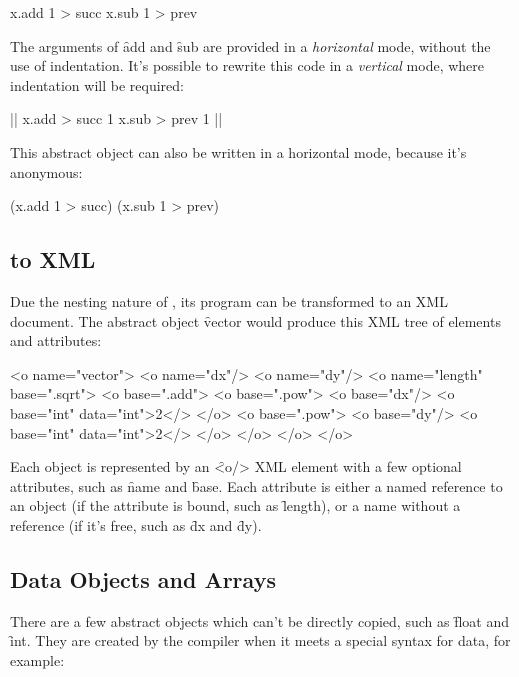 \begin{eocode}
[x]
  x.add 1 > succ
  x.sub 1 > prev
\end{eocode}

The arguments of \f{add} and \f{sub} are provided in a \emph{horizontal}
mode, without the use of indentation. It's possible to rewrite this code
in a \emph{vertical} mode, where indentation will be required:

\begin{eocode}
[x] |$\label{ln:succ}$|
  x.add > succ
    1
  x.sub > prev
    1 |$\label{ln:succ-end}$|
\end{eocode}

This abstract object can also be written in a horizontal mode,
because it's anonymous:

\begin{eocode}
[x] (x.add 1 > succ) (x.sub 1 > prev)
\end{eocode}

\subsection{\eo{} to XML}\label{sec:xml}

Due the nesting nature of \eo{}, its program can be transformed
to an XML document. The abstract object \f{vector} would produce
this XML tree of elements and attributes:

\begin{eocode}
<o name="vector">
  <o name="dx"/>
  <o name="dy"/>
  <o name="length" base=".sqrt">
    <o base=".add">
      <o base=".pow">
        <o base="dx"/>
        <o base="int" data="int">2</>
      </o>
      <o base=".pow">
        <o base="dy"/>
        <o base="int" data="int">2</>
      </o>
    </o>
  </o>
</o>
\end{eocode}

Each object is represented by an \f{<o/>} XML element with a few
optional attributes, such as \f{name} and \f{base}. Each
attribute is either a named reference to an object (if the attribute is bound,
such as \f{length}), or a name without a reference (if it's free,
such as \f{dx} and \f{dy}).

\subsection{Data Objects and Arrays}

There are a few abstract objects which can't be directly copied, such as
\f{float} and \f{int}. They are created by the compiler when it meets
a special syntax for data, for example:

